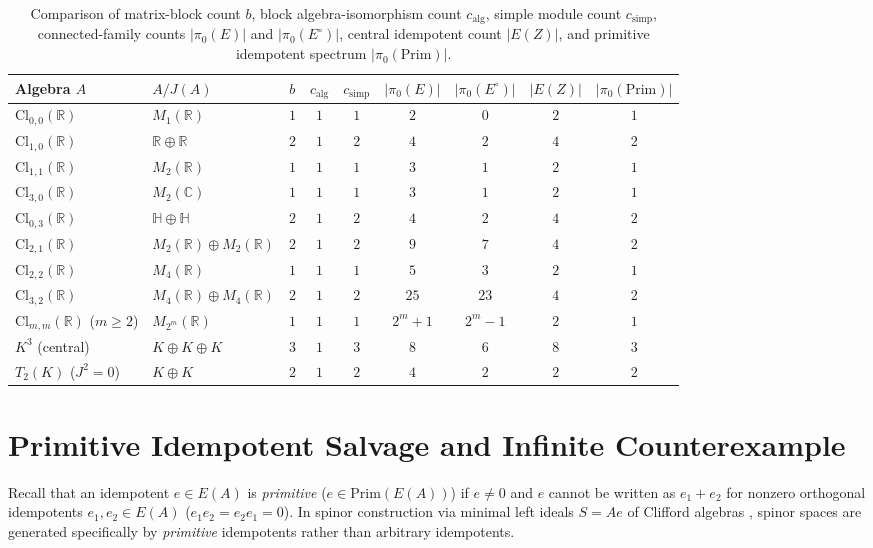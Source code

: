 \documentclass[11pt,a4paper]{article}
\theoremstyle{definition}
\newcommand{\R}{\mathbb{R}}
\newcommand{\C}{\mathbb{C}}
\newcommand{\HH}{\mathbb{H}}
\newcommand{\Cl}{\mathrm{Cl}}
\newcommand{\Prim}{\mathrm{Prim}}
\begin{document}
\begin{table}[!ht]
\centering
\small
\begin{tabular}{|l|l|c|c|c|c|c|c|c|}
\hline
\textbf{Algebra $A$} & \textbf{$A/J(A)$} & $b$ & $c_{\mathrm{alg}}$ & $c_{\mathrm{simp}}$
  & $|\pi_0(E)|$ & $|\pi_0(E^\circ)|$ & $|E(Z)|$ & $|\pi_0(\Prim)|$ \\
\hline
$\Cl_{0,0}(\R)$ & $M_1(\R)$ & $1$ & $1$ & $1$ & $2$ & $0$ & $2$ & $1$ \\
$\Cl_{1,0}(\R)$ & $\R \oplus \R$ & $2$ & $1$ & $2$ & $4$ & $2$ & $4$ & $2$ \\
$\Cl_{1,1}(\R)$ & $M_2(\R)$ & $1$ & $1$ & $1$ & $3$ & $1$ & $2$ & $1$ \\
$\Cl_{3,0}(\R)$ & $M_2(\C)$ & $1$ & $1$ & $1$ & $3$ & $1$ & $2$ & $1$ \\
$\Cl_{0,3}(\R)$ & $\HH \oplus \HH$ & $2$ & $1$ & $2$ & $4$ & $2$ & $4$ & $2$ \\
$\Cl_{2,1}(\R)$ & $M_2(\R) \oplus M_2(\R)$ & $2$ & $1$ & $2$ & $9$ & $7$ & $4$ & $2$ \\
$\Cl_{2,2}(\R)$ & $M_4(\R)$ & $1$ & $1$ & $1$ & $5$ & $3$ & $2$ & $1$ \\
$\Cl_{3,2}(\R)$ & $M_4(\R) \oplus M_4(\R)$ & $2$ & $1$ & $2$ & $25$ & $23$ & $4$ & $2$ \\
$\Cl_{m,m}(\R)$ ($m\ge 2$) & $M_{2^m}(\R)$ & $1$ & $1$ & $1$ & $2^m+1$ & $2^m-1$ & $2$ & $1$ \\
$K^3$ (central) & $K \oplus K \oplus K$ & $3$ & $1$ & $3$ & $8$ & $6$ & $8$ & $3$ \\
$T_2(K)$ ($J^2=0$) & $K \oplus K$ & $2$ & $1$ & $2$ & $4$ & $2$ & $2$ & $2$ \\
\hline
\end{tabular}
\caption{Comparison of matrix-block count $b$, block algebra-isomorphism count
$c_{\mathrm{alg}}$, simple module count $c_{\mathrm{simp}}$, connected-family counts
$|\pi_0(E)|$ and $|\pi_0(E^\circ)|$, central idempotent count $|E(Z)|$, and primitive
idempotent spectrum $|\pi_0(\Prim)|$.}
\label{tab:clifford}
\end{table}

\section{Primitive Idempotent Salvage and Infinite Counterexample}

Recall that an idempotent $e\in E(A)$ is \emph{primitive} ($e\in\Prim(E(A))$) if $e\ne 0$ and
$e$ cannot be written as $e_1 + e_2$ for nonzero orthogonal idempotents $e_1,e_2\in E(A)$
($e_1 e_2 = e_2 e_1 = 0$). In spinor construction via minimal left ideals $S = Ae$ of
Clifford algebras \cite{LawsonMichelsohn}, spinor spaces are generated specifically by
\emph{primitive} idempotents rather than arbitrary idempotents.
\end{document}
